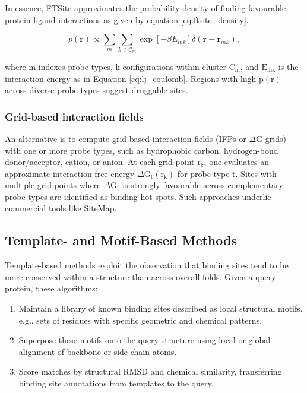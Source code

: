 \documentclass[12pt]{article}
\begin{document}
In essence, FTSite\cite{CH5_Ngan2012} approximates the probability density of finding favourable protein-ligand interactions as given by equation \ref{eq:ftsite_density}.

\begin{equation}
p(\mathbf{r}) \propto \sum_{m} \sum_{k \in \mathcal{C}_m} \exp \left[ - \beta E_{mk} \right] \delta(\mathbf{r} - \mathbf{r}_{mk}),
\label{eq:ftsite_density}
\end{equation}

where m indexes probe types, k configurations within cluster $\textrm{C}_\textrm{m}$, and $\textrm{E}_\textrm{mk}$ is the interaction energy as in Equation \ref{eq:lj_coulomb}. Regions with high $\textrm{p}(\textrm{r})$ across diverse probe types suggest druggable sites.

\subsubsection{Grid-based interaction fields}

An alternative is to compute grid-based interaction fields (IFPs or $\Delta \textrm{G}$ grids) with one or more probe types, such as hydrophobic carbon, hydrogen-bond donor/acceptor, cation, or anion. At each grid point $\textrm{r}_\textrm{k}$, one evaluates an approximate interaction free energy $\Delta \textrm{G}_\textrm{t}(\textrm{r}_\textrm{k})$ for probe type t. Sites with multiple grid points where $\Delta \textrm{G}_\textrm{t}$ is strongly favourable across complementary probe types are identified as binding hot spots. Such approaches underlie commercial tools like SiteMap\cite{CH5_Halgren2009}.

\subsection{Template- and Motif-Based Methods}

Template-based methods\cite{CH5_ghersi2011beyond} exploit the observation that binding sites tend to be more conserved within a structure than across overall folds. Given a query protein, these algorithms:
\begin{enumerate}
    \item Maintain a library of known binding sites described as local structural motifs, e.g., sets of residues with specific geometric and chemical patterns.
    \item Superpose these motifs onto the query structure using local or global alignment of backbone or side-chain atoms.
    \item Score matches by structural RMSD and chemical similarity, transferring binding site annotations from templates to the query.
\end{enumerate}
\end{document}
